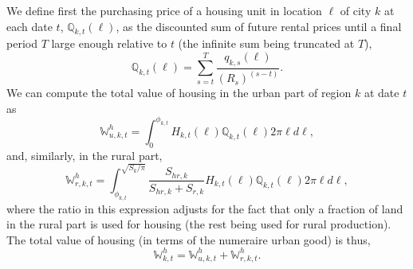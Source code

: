 \documentclass[11pt]{report}
\begin{document}
We define first the purchasing price of a housing unit in location $\ell$ of city $k$ at each date $t$, $\mathbb{Q}_{k,t}(\ell)$, as the discounted sum of future rental prices until a final period $T$ large enough relative to $t$ (the infinite sum being truncated at $T$),
\begin{equation*}
\mathbb{Q}_{k,t}(\ell)=\sum_{s=t}^{T}\frac{q_{k,s}(\ell)}{(R_s)^{(s-t)}}.
\end{equation*}
We can compute the total value of housing in the urban part of region $k$ at date $t$ as
\begin{equation}
\mathbb{W}_{u,k,t}^h=\int_0^{\phi_{k,t}}H_{k,t}(\ell) \mathbb{Q}_{k,t}(\ell) 2 \pi \ell  d\ell ,\label{B-eq:Wkthu}
\end{equation}
and, similarly, in the rural part,
\begin{equation}
\mathbb{W}_{r,k,t}^h=\int_{\phi_{k,t}}^{\sqrt{S_{k}/\pi}}\frac{S_{hr,k}}{S_{hr,k}+S_{r,k}}H_{k,t}(\ell) \mathbb{Q}_{k,t}(\ell) 2 \pi \ell  d\ell,\label{B-eq:Wkthr}
\end{equation}
where the ratio in this expression adjusts for the fact that only a fraction of land in the rural part is used for housing (the rest being used for rural production).
The total value of housing (in terms of the numeraire urban good) is thus, $$\mathbb{W}_{k,t}^h=\mathbb{W}_{u,k,t}^h+\mathbb{W}_{r,k,t}^h.$$
\end{document}
